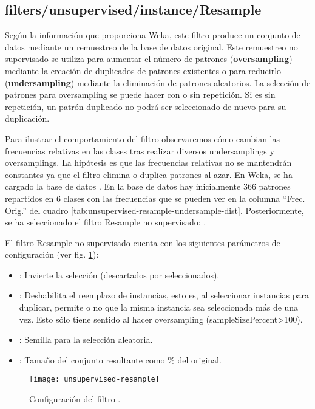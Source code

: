 \subsection{filters/unsupervised/instance/Resample}
\label{ssc:unsupervised-resample}
Según la información que proporciona Weka, este filtro produce un conjunto de datos mediante un remuestreo de la base de datos original. Este remuestreo no supervisado se utiliza para aumentar el número de patrones (\textbf{oversampling}) mediante la creación de duplicados de patrones existentes o para reducirlo (\textbf{undersampling}) mediante la eliminación de patrones aleatorios. La selección de patrones para oversampling se puede hacer con o sin repetición. Si es sin repetición, un patrón duplicado no podrá ser seleccionado de nuevo para su duplicación.

Para ilustrar el comportamiento del filtro observaremos cómo cambian las frecuencias relativas en las clases tras realizar diversos undersamplings y oversamplings. La hipótesis es que las frecuencias relativas no se mantendrán constantes ya que el filtro elimina o duplica patrones al azar. En Weka, se ha cargado la base de datos . En la base de datos hay inicialmente 366 patrones repartidos en 6 clases con las frecuencias que se pueden ver en la columna ``Frec. Orig.'' del cuadro \ref{tab:unsupervised-resample-undersample-dist}. Posteriormente, se ha seleccionado el filtro Resample no supervisado: .

El filtro Resample no supervisado cuenta con los siguientes parámetros de configuración (ver fig. \ref{fig:unsupervised-resample}):

\begin{itemize}
    \item {}: Invierte la selección (descartados por seleccionados).
    \item {}: Deshabilita el reemplazo de instancias, esto es, al seleccionar instancias para duplicar, permite o no que la misma instancia sea seleccionada más de una vez. Esto sólo tiene sentido al hacer oversampling (sampleSizePercent>100).
    \item {}: Semilla para la selección aleatoria.
    \item {}: Tamaño del conjunto resultante como \% del original.
\end{itemize}

\begin{figure}[ht]
    \centering
    \texttt{[image: unsupervised-resample]}
    \caption{Configuración del filtro .}
    \label{fig:unsupervised-resample}
\end{figure}

